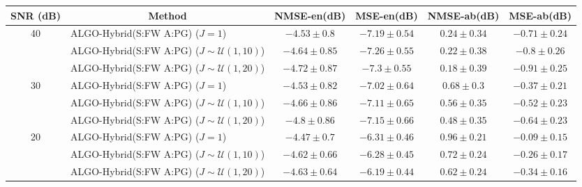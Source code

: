 \begin{table}[h]
\centering
\begin{adjustbox}{max width=\textwidth}
\begin{tabular}{|c|l|c|c|c|c|}
\hline
SNR (dB)            & \multicolumn{1}{c|}{Method}                       & NMSE-en(dB)         & MSE-en(dB)          & NMSE-ab(dB)         & MSE-ab(dB)          \tabularnewline \hline
\multirow{3}{*}{40} & ALGO-Hybrid(S:FW A:PG) ($J=1$)                    & $-4.53    \pm 0.8$  & $-7.19    \pm 0.54$ & $0.24     \pm 0.34$ & $-0.71    \pm 0.24$ \tabularnewline
                    & ALGO-Hybrid(S:FW A:PG) ($J\sim\mathcal{U}(1,10)$) & $-4.64    \pm 0.85$ & $-7.26    \pm 0.55$ & $0.22     \pm 0.38$ & $-0.8     \pm 0.26$ \tabularnewline
                    & ALGO-Hybrid(S:FW A:PG) ($J\sim\mathcal{U}(1,20)$) & $-4.72    \pm 0.87$ & $-7.3     \pm 0.55$ & $0.18     \pm 0.39$ & $-0.91    \pm 0.25$ \tabularnewline \hline
\multirow{3}{*}{30} & ALGO-Hybrid(S:FW A:PG) ($J=1$)                    & $-4.53    \pm 0.82$ & $-7.02    \pm 0.64$ & $0.68     \pm 0.3$  & $-0.37    \pm 0.21$ \tabularnewline
                    & ALGO-Hybrid(S:FW A:PG) ($J\sim\mathcal{U}(1,10)$) & $-4.66    \pm 0.86$ & $-7.11    \pm 0.65$ & $0.56     \pm 0.35$ & $-0.52    \pm 0.23$ \tabularnewline
                    & ALGO-Hybrid(S:FW A:PG) ($J\sim\mathcal{U}(1,20)$) & $-4.8     \pm 0.86$ & $-7.15    \pm 0.66$ & $0.48     \pm 0.35$ & $-0.64    \pm 0.23$ \tabularnewline \hline
\multirow{3}{*}{20} & ALGO-Hybrid(S:FW A:PG) ($J=1$)                    & $-4.47    \pm 0.7$  & $-6.31    \pm 0.46$ & $0.96     \pm 0.21$ & $-0.09    \pm 0.15$ \tabularnewline
                    & ALGO-Hybrid(S:FW A:PG) ($J\sim\mathcal{U}(1,10)$) & $-4.62    \pm 0.66$ & $-6.28    \pm 0.45$ & $0.72     \pm 0.24$ & $-0.26    \pm 0.17$ \tabularnewline
                    & ALGO-Hybrid(S:FW A:PG) ($J\sim\mathcal{U}(1,20)$) & $-4.63    \pm 0.64$ & $-6.19    \pm 0.44$ & $0.62     \pm 0.24$ & $-0.34    \pm 0.16$ \tabularnewline \hline

\end{tabular}
\end{adjustbox}
\end{table}
